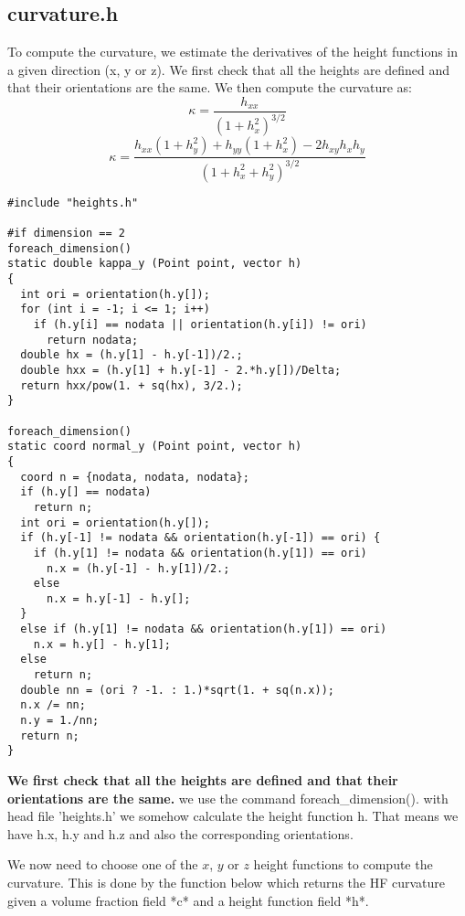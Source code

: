 \documentclass[12pt]{article} %
\begin{document}
\subsection{curvature.h}
To compute the curvature, we estimate the derivatives of the height functions in a given direction (x, y or z). We first check that all the heights are defined and that their orientations are the same. We then compute the curvature as:
$$
\kappa = \frac{h_{xx}}{(1 + h_x^2)^{3/2}}
$$
$$
\kappa = \frac{h_{xx}(1 + h_y^2) + h_{yy}(1 + h_x^2) - 2h_{xy}h_xh_y}
{(1 + h_x^2 + h_y^2)^{3/2}}
$$
\begin{lstlisting}[style=CStyle]
#include "heights.h"

#if dimension == 2
foreach_dimension()
static double kappa_y (Point point, vector h)
{
  int ori = orientation(h.y[]);
  for (int i = -1; i <= 1; i++)
    if (h.y[i] == nodata || orientation(h.y[i]) != ori)
      return nodata;
  double hx = (h.y[1] - h.y[-1])/2.;
  double hxx = (h.y[1] + h.y[-1] - 2.*h.y[])/Delta;
  return hxx/pow(1. + sq(hx), 3/2.);
}

foreach_dimension()
static coord normal_y (Point point, vector h)
{
  coord n = {nodata, nodata, nodata};
  if (h.y[] == nodata)
    return n;
  int ori = orientation(h.y[]);
  if (h.y[-1] != nodata && orientation(h.y[-1]) == ori) {
    if (h.y[1] != nodata && orientation(h.y[1]) == ori)
      n.x = (h.y[-1] - h.y[1])/2.;
    else
      n.x = h.y[-1] - h.y[];
  }
  else if (h.y[1] != nodata && orientation(h.y[1]) == ori)
    n.x = h.y[] - h.y[1];
  else
    return n;
  double nn = (ori ? -1. : 1.)*sqrt(1. + sq(n.x));
  n.x /= nn;
  n.y = 1./nn;
  return n;
}
\end{lstlisting}
\par
\textbf{We first check that all the heights are defined and that their orientations are the same.} we use the command foreach\_dimension().
with head file 'heights.h' we somehow calculate the height function h. That means we have h.x, h.y and h.z and also the corresponding orientations. \par
We now need to choose one of the $x$, $y$ or $z$ height functions to
compute the curvature. This is done by the function below which
returns the HF curvature given a volume fraction field *c* and a
height function field *h*.
\end{document}
